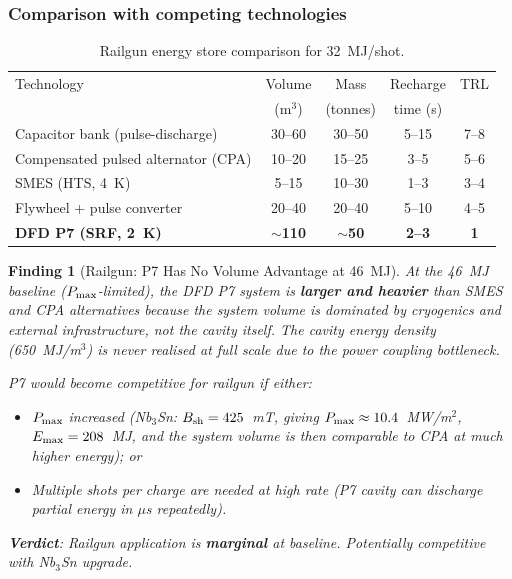 \documentclass[11pt]{article}
\newtheorem{finding}{Finding}
\newcommand{\Pmax}{P_{\rm max}}
\begin{document}
\subsubsection{Comparison with competing technologies}

\begin{table}[h]
\centering
\caption{Railgun energy store comparison for 32~MJ/shot.}
\label{tab:railgun}
\begin{tabular}{@{}lcccc@{}}
\toprule
Technology & Volume & Mass & Recharge & TRL \\
 & (m$^3$) & (tonnes) & time (s) & \\
\midrule
Capacitor bank (pulse-discharge) & 30--60 & 30--50 & 5--15 & 7--8 \\
Compensated pulsed alternator (CPA) & 10--20 & 15--25 & 3--5 & 5--6 \\
SMES (HTS, 4~K) & 5--15 & 10--30 & 1--3 & 3--4 \\
Flywheel + pulse converter & 20--40 & 20--40 & 5--10 & 4--5 \\
\textbf{DFD P7 (SRF, 2~K)} & \textbf{$\sim$110} & \textbf{$\sim$50} &
  \textbf{2--3} & \textbf{1} \\
\bottomrule
\end{tabular}
\end{table}

\begin{finding}[Railgun: P7 Has No Volume Advantage at 46~MJ]
\label{find:railgun}
At the 46~MJ baseline ($\Pmax$-limited), the DFD P7 system is
\textbf{larger and heavier} than SMES and CPA alternatives because the
system volume is dominated by cryogenics and external infrastructure, not
the cavity itself. The cavity energy density (650~MJ/m$^3$) is never
realised at full scale due to the power coupling bottleneck.

P7 would become competitive for railgun if either:
\begin{itemize}[nosep]
  \item $\Pmax$ increased (Nb$_3$Sn: $B_{\rm sh} = 425$~mT, giving
    $\Pmax \approx 10.4$~MW/m$^2$, $E_{\rm max} = 208$~MJ, and the
    system volume is then comparable to CPA at much higher energy); or
  \item Multiple shots per charge are needed at high rate (P7 cavity
    can discharge partial energy in $\mu$s repeatedly).
\end{itemize}

\textbf{Verdict}: Railgun application is \textbf{marginal} at baseline.
Potentially competitive with Nb$_3$Sn upgrade.
\end{finding}
\end{document}
